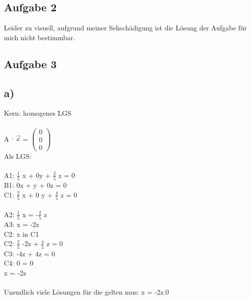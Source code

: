 \documentclass{article}
\begin{document}
	 \subsection*{Aufgabe 2}
	 Leider zu visuell, aufgrund meiner Sehschädigung ist die Lösung der Aufgabe für mich nicht bestimmbar.
	 \subsection*{Aufgabe 3}
	 \subsection*{a)}
	 Kern: homogenes LGS \\ \\
	 A $\cdot$ $\vec{x}$ =
	 $\left(
	 \begin{array}{c}
	 0 \\ 0 \\ 0
	 \end{array}
	 \right)$ \\
	 Als LGS: \\ \\
	 A1: $\frac{1}{5}$ x + 0y + $\frac{2}{5}$ z = 0 \\
	 B1: 0x + y + 0z = 0 \\
	 C1: $\frac{2}{5}$ x + 0 y + $\frac{4}{5}$ z = 0 \\ \\
	 A2: $\frac{1}{5}$ x = -$\frac{2}{5}$ z  \\
	 A3: x = -2z \\
	 C2: x in C1 \\
	 C2: $\frac{2}{5}$ -2z + $\frac{4}{5}$ z = 0 \\
	 C3: -4z + 4z = 0 \\
	 C4: 0 = 0 \\
	 x = -2z \\ \\
	 Unendlich viele Lösungen für die gelten mus: x = -2z.0
\end{document}
